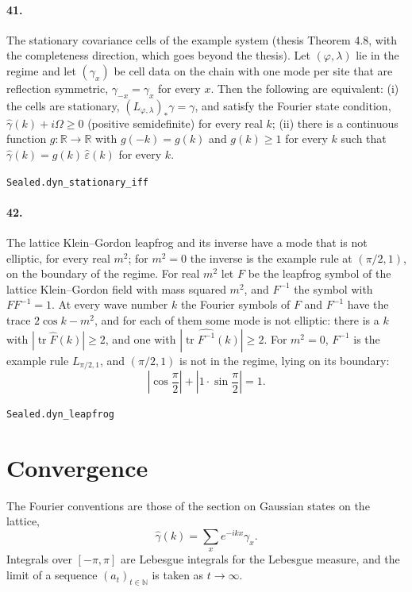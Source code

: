 \documentclass[11pt]{article}
\begin{document}
\paragraph{41.} The stationary covariance cells of the example system (thesis Theorem 4.8, with the completeness direction, which goes beyond the thesis). Let $(\varphi, \lambda)$ lie in the regime and let $(\gamma_x)$ be cell data on the chain with one mode per site that are reflection symmetric, $\gamma_{-x} = \gamma_x$ for every $x$. Then the following are equivalent: (i) the cells are stationary, $(L_{\varphi, \lambda})_* \gamma = \gamma$, and satisfy the Fourier state condition, $\hat\gamma(k) + i\Omega \ge 0$ (positive semidefinite) for every real $k$; (ii) there is a continuous function $g : \mathbb R \to \mathbb R$ with $g(-k) = g(k)$ and $g(k) \ge 1$ for every $k$ such that $\hat\gamma(k) = g(k)\, \hat\varepsilon(k)$ for every $k$.\par{\footnotesize\texttt{Sealed.dyn\_stationary\_iff}}

\paragraph{42.} The lattice Klein–Gordon leapfrog and its inverse have a mode that is not elliptic, for every real $m^2$; for $m^2 = 0$ the inverse is the example rule at $(\pi/2, 1)$, on the boundary of the regime. For real $m^2$ let $F$ be the leapfrog symbol of the lattice Klein–Gordon field with mass squared $m^2$, and $F^{-1}$ the symbol with $F F^{-1} = 1$. At every wave number $k$ the Fourier symbols of $F$ and $F^{-1}$ have the trace $2\cos k - m^2$, and for each of them some mode is not elliptic: there is a $k$ with $|\operatorname{tr}\hat F(k)| \ge 2$, and one with $|\operatorname{tr}\widehat{F^{-1}}(k)| \ge 2$. For $m^2 = 0$, $F^{-1}$ is the example rule $L_{\pi/2, 1}$, and $(\pi/2, 1)$ is not in the regime, lying on its boundary: \[|\cos\frac\pi2| + |1 \cdot \sin\frac\pi2| = 1.\]\par{\footnotesize\texttt{Sealed.dyn\_leapfrog}}

\section*{Convergence}
The Fourier conventions are those of the section on Gaussian states on the lattice, \[\hat\gamma(k) = \sum_x e^{-ikx}\gamma_x.\] Integrals over $[-\pi, \pi]$ are Lebesgue integrals for the Lebesgue measure, and the limit of a sequence $(a_t)_{t \in \mathbb N}$ is taken as $t \to \infty$.
\end{document}
